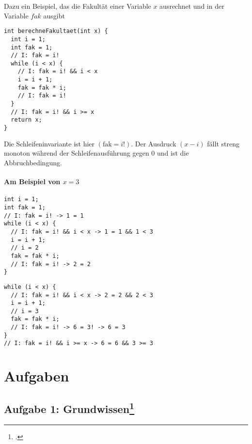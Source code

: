 \documentclass{lehramt-informatik}
\begin{document}
Dazu ein Beispiel, das die Fakultät einer Variable $x$ ausrechnet und in
der Variable $fak$ ausgibt

\begin{verbatim}
int berechneFakultaet(int x) {
  int i = 1;
  int fak = 1;
  // I: fak = i!
  while (i < x) {
    // I: fak = i! && i < x
    i = i + 1;
    fak = fak * i;
    // I: fak = i!
  }
  // I: fak = i! && i >= x
  return x;
}
\end{verbatim}

\noindent
Die Schleifeninvariante ist hier $(\text{fak} = i!)$. Der Ausdruck $(x -
i)$ fällt streng monoton während der Schleifenausführung gegen $0$ und
ist die Abbruchbedingung.

\subsubsection{Am Beispiel von $x = 3$}

\begin{multicols}{2}

\begin{verbatim}
int i = 1;
int fak = 1;
// I: fak = i! -> 1 = 1
while (i < x) {
  // I: fak = i! && i < x -> 1 = 1 && 1 < 3
  i = i + 1;
  // i = 2
  fak = fak * i;
  // I: fak = i! -> 2 = 2
}
\end{verbatim}


\begin{verbatim}
while (i < x) {
  // I: fak = i! && i < x -> 2 = 2 && 2 < 3
  i = i + 1;
  // i = 3
  fak = fak * i;
  // I: fak = i! -> 6 = 3! -> 6 = 3
}
// I: fak = i! && i >= x -> 6 = 6 && 3 >= 3
\end{verbatim}

\end{multicols}


\chapter{Aufgaben}

\section{Aufgabe 1: Grundwissen\footcite[Seite 1]{sosy:ab:8}}
\end{document}
